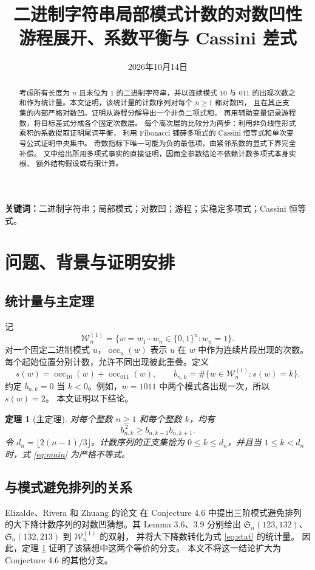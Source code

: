 \documentclass[UTF8,a4paper,11pt,fontset=none]{ctexart}
\title{\textbf{二进制字符串局部模式计数的对数凹性}\\[0.3em]
  \large 游程展开、系数平衡与 Cassini 差式}
\author{}
\date{2026年10月14日}
\numberwithin{equation}{section}
\theoremstyle{paperplain}
\newtheorem{theorem}{定理}[section]
\theoremstyle{definition}
\theoremstyle{remark}
\DeclareMathOperator{\occ}{occ}
\begin{document}
\maketitle
\begin{abstract}
考虑所有长度为 $n$ 且末位为 $1$ 的二进制字符串，并以连续模式 $10$ 与 $011$
的出现次数之和作为统计量。本文证明，该统计量的计数序列对每个 $n\ge1$ 都对数凹，
且在其正支集的内部严格对数凹。证明从游程分解导出一个非负二项式和，
再用辅助变量记录游程数，将目标差式分成各个固定次数层。
每个高次层的比较分为两步：利用非负线性形式乘积的系数提取证明尾词平衡，
利用 Fibonacci 铺砖多项式的 Cassini 恒等式和单次变号公式证明中央集中。
奇数指标下唯一可能为负的最低项，由紧邻系数的显式下界完全补偿。
文中给出所用多项式事实的直接证明，因而全参数结论不依赖计数多项式本身实根、
额外结构假设或有限计算。
\end{abstract}
\noindent\textbf{关键词：}二进制字符串；局部模式；对数凹；游程；实稳定多项式；Cassini 恒等式。

\section{问题、背景与证明安排}\label{sec:intro}
\subsection{统计量与主定理}
记
\[
\mathcal W_n^{(1)}=\{w=w_1\cdots w_n\in\{0,1\}^n:w_n=1\}.
\]
对一个固定二进制模式 $u$，$\occ_u(w)$ 表示 $u$ 在 $w$ 中作为连续片段出现的次数。
每个起始位置分别计数，允许不同出现彼此重叠。定义
\begin{equation}\label{eq:stat}
s(w)=\occ_{10}(w)+\occ_{011}(w),\qquad
b_{n,k}=\#\{w\in\mathcal W_n^{(1)}:s(w)=k\}.
\end{equation}
约定 $b_{n,k}=0$ 当 $k<0$。例如，$w=1011$ 中两个模式各出现一次，所以 $s(w)=2$。
本文证明以下结论。

\begin{theorem}[主定理]\label{thm:main}
对每个整数 $n\ge1$ 和每个整数 $k$，均有
\begin{equation}\label{eq:main}
b_{n,k}^{\,2}\ge b_{n,k-1}b_{n,k+1}.
\end{equation}
令 $d_n=\lfloor2(n-1)/3\rfloor$。计数序列的正支集恰为
$0\le k\le d_n$，并且当 $1\le k<d_n$ 时，式 \eqref{eq:main} 为严格不等式。
\end{theorem}

\subsection{与模式避免排列的关系}
Elizalde、Rivera 和 Zhuang 的论文 \cite{ERZ} 在 Conjecture 4.6 中提出三阶模式避免排列
的大下降计数序列的对数凹猜想。其 Lemma 3.6、3.9 分别给出
$\mathfrak S_n(123,132)$、$\mathfrak S_n(132,213)$ 到 $\mathcal W_n^{(1)}$ 的双射，
并将大下降数转化为式 \eqref{eq:stat} 的统计量。
因此，定理 \ref{thm:main} 证明了该猜想中这两个等价的分支。
本文不将这一结论扩大为 Conjecture 4.6 的其他分支。
\end{document}
